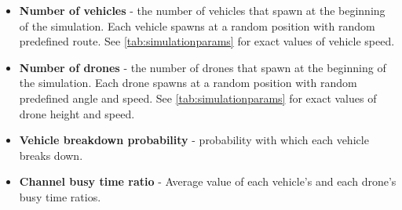 \documentclass[]{nsm-thesis}
\begin{document}
\begin{itemize}

	\item \textbf{Number of vehicles} - the number of vehicles that spawn at the beginning of the simulation. Each vehicle spawns at a random position with random predefined route. See \cref{tab:simulationparams} for exact values of vehicle speed.
	
	\item \textbf{Number of drones} - the number of drones that spawn at the beginning of the simulation. Each drone spawns at a random position with random predefined angle and speed. See \cref{tab:simulationparams} for exact values of drone height and speed.
	
	\item \textbf{Vehicle breakdown probability} - probability with which each vehicle breaks down.

	\item \textbf{Channel busy time ratio} - Average value of each vehicle's and each drone's busy time ratios.
\end{itemize}

\end{document}
